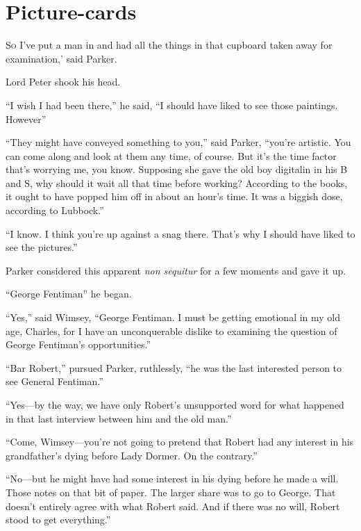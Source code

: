 \chapter{Picture-cards}

\lettrine[lines=4,ante=‘]{S}{o} I've put a man in and had all the things in that cupboard taken away for examination,' said Parker.

\zz
Lord Peter shook his head.

\zz
\enquote{I wish I had been there,} he said, \enquote{I should have liked to see those paintings. However\longdash}

\enquote{They might have conveyed something to you,} said Parker, \enquote{you're artistic. You can come along and look at them any time, of course. But it's the time factor that's worrying me, you know. Supposing she gave the old boy digitalin in his B and S, why should it wait all that time before working? According to the books, it ought to have popped him off in about an hour's time. It was a biggish dose, according to Lubbock.}

\enquote{I know. I think you're up against a snag there. That's why I should have liked to see the pictures.}

Parker considered this apparent \textit{non sequitur} for a few moments and gave it up.

\enquote{George Fentiman\longdash} he began.

\enquote{Yes,} said Wimsey, \enquote{George Fentiman. I must be getting emotional in my old age, Charles, for I have an unconquerable dislike to examining the question of George Fentiman's opportunities.}

\enquote{Bar Robert,} pursued Parker, ruthlessly, \enquote{he was the last interested person to see General Fentiman.}

\enquote{Yes\allowbreak---\allowbreak by the way, we have only Robert's unsupported word for what happened in that last interview between him and the old man.}

\enquote{Come, Wimsey\allowbreak---\allowbreak you're not going to pretend that Robert had any interest in his grandfather's dying before Lady Dormer. On the contrary.}

\enquote{No\allowbreak---\allowbreak but he might have had some interest in his dying before he made a will. Those notes on that bit of paper. The larger share was to go to George. That doesn't entirely agree with what Robert said. And if there was no will, Robert stood to get everything.}

